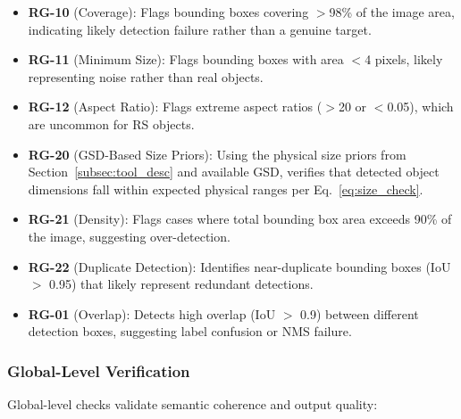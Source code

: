 \documentclass[journal]{IEEEtran}
\begin{document}
\begin{itemize}[leftmargin=*]
    \item \textbf{RG-10} (Coverage): Flags bounding boxes covering $>$98\% of the image area, indicating likely detection failure rather than a genuine target.
    \item \textbf{RG-11} (Minimum Size): Flags bounding boxes with area $<$4 pixels, likely representing noise rather than real objects.
    \item \textbf{RG-12} (Aspect Ratio): Flags extreme aspect ratios ($>$20 or $<$0.05), which are uncommon for RS objects.
    \item \textbf{RG-20} (GSD-Based Size Priors): Using the physical size priors from Section~\ref{subsec:tool_desc} and available GSD, verifies that detected object dimensions fall within expected physical ranges per Eq.~\eqref{eq:size_check}.
    \item \textbf{RG-21} (Density): Flags cases where total bounding box area exceeds 90\% of the image, suggesting over-detection.
    \item \textbf{RG-22} (Duplicate Detection): Identifies near-duplicate bounding boxes (IoU $>$ 0.95) that likely represent redundant detections.
    \item \textbf{RG-01} (Overlap): Detects high overlap (IoU $>$ 0.9) between different detection boxes, suggesting label confusion or NMS failure.
\end{itemize}

\subsubsection{Global-Level Verification}
Global-level checks validate semantic coherence and output quality:
\end{document}
